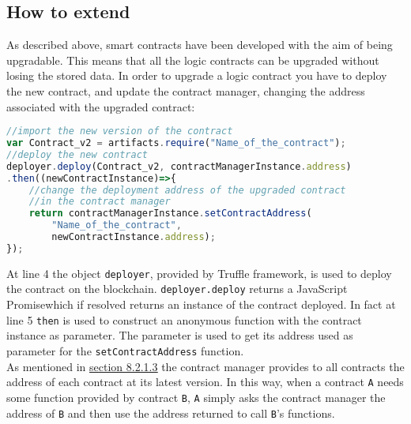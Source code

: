 \subsection{How to extend}
As described above, smart contracts have been developed with the aim of being upgradable. This means that all the logic contracts can be upgraded without losing the stored data. In order to upgrade a logic contract you have to deploy the new contract, and update the contract manager, changing the address associated with the upgraded contract:
\begin{lstlisting}[language=JavaScript]
//import the new version of the contract
var Contract_v2 = artifacts.require("Name_of_the_contract");
//deploy the new contract
deployer.deploy(Contract_v2, contractManagerInstance.address)
.then((newContractInstance)=>{
	//change the deployment address of the upgraded contract
	//in the contract manager
	return contractManagerInstance.setContractAddress(
		"Name_of_the_contract", 
		newContractInstance.address);
});
\end{lstlisting}
At line 4 the object \texttt{deployer}, provided by Truffle framework, is used to deploy the contract on the blockchain. \texttt{deployer.deploy} returns a JavaScript Promise\glosp which if resolved returns an instance of the contract deployed. In fact at line 5 \texttt{then} is used to construct an anonymous function with the contract instance as parameter. The parameter is used to get its address used as parameter for the \texttt{setContractAddress} function. \\
As mentioned in  \hyperlink{cm}{\underline{section 8.2.1.3}} the contract manager provides to all contracts the address of each contract at its latest version. In this way, when a contract \texttt{A} needs some function provided by contract \texttt{B}, \texttt{A} simply asks the contract manager the address of \texttt{B} and then use the address returned to call \texttt{B}'s functions.

